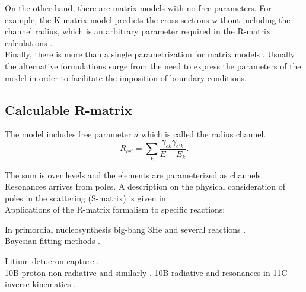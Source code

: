 \documentclass[openany]{book}
\begin{document}
On the other hand, there are matrix models with no free parameters. For example, the K-matrix model predicts the cross sections without including the channel radius, which is an arbitrary parameter required in the R-matrix calculations \cite{humblet_1990}. \\

Finally, there is more than a single parametrization for matrix models \cite{brune_2002}. Usually the alternative formulations surge from the need to express the parameters of the model in order to facilitate the imposition of boundary conditions.  

\subsection{Calculable R-matrix} \label{sub:rmatrix_calculable}

The model includes free parameter $a$ which is called the radius channel. \\

\begin{equation}  \label{eq:rmatrix_elements}
	R_{cc'} = \sum_k {\frac{\gamma_{ck} \gamma_{c'k}}{E - E_k}}.
\end{equation}

The sum is over levels and the elements are parameterized as channels.  \\

Resonances arrives from poles. A description on the physical consideration of poles in the scattering (S-matrix) is given in \cite{ramirezjimenez_kelkar_2018}. \\

Applications of the R-matrix formalism to specific reactions:

In primordial nucleosynthesis \cite{desouza_iliadis_coc_2019} big-bang 3He and several reactions \cite{sparta_pizzone_bertulani_hou_lamia_tumino_2020}. \\

Bayesian fitting methods \cite{odell_brune_phillips_2022}.

Litium detueron capture \cite{grineviciute_lamia_mukhamedzhanov_spitaleri_lacognata_2015}. \\

10B proton non-radiative \cite{kolk_macon_deboer_anderson_boeltzig_brandenburg_brune_chen_clark_danley_et_2022} and similarly \cite{sieverding_randhawa_zetterberg_deboer_ahn_mancino_martinez-pinedo_hix_2022}. 10B radiative and resonances in 11C inverse kinematics \cite{kaur_guimaraes_zamora_assuncao_alcantara-nunez_delara_zevallos_ribeiro_lichtenthaler_pires_et_2022}.
\end{document}
